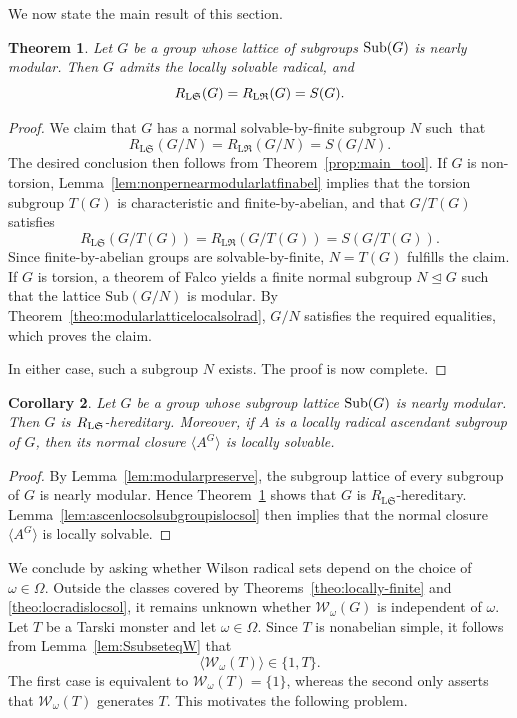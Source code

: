 \documentclass[11pt, reqno]{amsart}
\numberwithin{equation}{section}
\newtheorem{theorem}{Theorem}[section]
\newtheorem{corollary}[theorem]{Corollary}
\theoremstyle{definition}
\numberwithin{equation}{section}
\begin{document}
We now state the main result of this section.

\begin{theorem}\label{thm:target_3}
    Let $G$ be a group whose lattice of subgroups $\textup{Sub}(G)$ is nearly modular. Then $G$ admits the locally solvable radical, and 
    $$ R_{\textup{L}\mathfrak{S}}(G) = R_{\textup{L}\mathfrak{R}}(G) = S(G). $$
\end{theorem}

\begin{proof}
We claim that $G$ has a normal solvable-by-finite  subgroup $N$ such~that
$$R_{\mathrm{L}\mathfrak{S}}(G/N) = R_{\mathrm{L}\mathfrak{R}}(G/N) = S(G/N).$$
The desired conclusion then follows from Theorem~\ref{prop:main_tool}. If $G$ is non-torsion, Lemma~\ref{lem:nonpernearmodularlatfinabel} implies that the torsion subgroup $T(G)$ is characteristic and finite-by-abelian, and that $G/T(G)$ satisfies
$$R_{\mathrm{L}\mathfrak{S}}(G/T(G)) = R_{\mathrm{L}\mathfrak{R}}(G/T(G)) = S(G/T(G)).$$
Since finite-by-abelian groups are solvable-by-finite, $N = T(G)$ fulfills the claim. If $G$ is torsion, a theorem of Falco \cite{Falco2003} yields a finite normal subgroup $N \trianglelefteq G$ such that the lattice $\mathrm{Sub}(G/N)$ is modular. By Theorem~\ref{theo:modularlatticelocalsolrad}, $G/N$ satisfies the required equalities, which proves the claim.

In either case, such a subgroup $N$ exists. The proof is now complete.
\end{proof}

\begin{corollary}
Let $G$ be a group whose subgroup lattice $\textup{Sub}(G)$ is nearly modular. Then $G$ is $R_{\textup{L}\mathfrak{S}}$-hereditary. Moreover, if $A$ is a locally radical ascendant subgroup of $G$, then its normal closure $\langle A^G \rangle$ is locally solvable.
\end{corollary}

\begin{proof}
By Lemma~\ref{lem:modularpreserve}, the subgroup lattice of every subgroup
of $G$ is nearly modular. Hence Theorem~\ref{thm:target_3} shows that $G$ is
$R_{\mathrm{L}\mathfrak{S}}$-hereditary. Lemma~\ref{lem:ascenlocsolsubgroupislocsol} then implies that the normal closure
$\langle A^G\rangle$ is locally solvable.
\end{proof}

We conclude by asking whether Wilson radical sets depend on the choice of
$\omega\in\Omega$. Outside the classes covered by Theorems~\ref{theo:locally-finite} and \ref{theo:locradislocsol}, it remains
unknown whether $\mathcal W_\omega(G)$ is independent of $\omega$.
Let $T$ be a Tarski monster and let $\omega\in\Omega$. Since $T$ is nonabelian simple, it follows from Lemma~\ref{lem:SsubseteqW} that 
$$\langle\mathcal W_\omega(T)\rangle\in\{1,T\}.$$
The first case is equivalent to $\mathcal W_\omega(T)=\{1\}$, whereas the second only asserts that $\mathcal W_\omega(T)$ generates $T$. This motivates the following problem.
\end{document}
